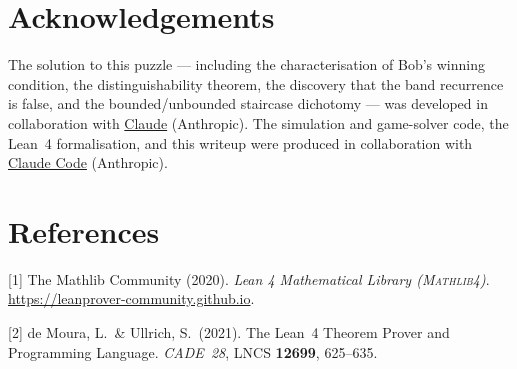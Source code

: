 \documentclass{article}
\begin{document}
\section*{Acknowledgements}

The solution to this puzzle --- including the characterisation of Bob's
winning condition, the distinguishability theorem, the discovery that the
band recurrence is false, and the bounded/unbounded staircase dichotomy
--- was developed in collaboration with
\href{https://claude.ai}{Claude} (Anthropic).  The simulation and
game-solver code, the Lean~4 formalisation, and this writeup were
produced in collaboration with
\href{https://claude.ai/code}{Claude Code} (Anthropic).

\section*{References}

{\small

[1] The Mathlib Community (2020).
\textit{Lean 4 Mathematical Library (\textsc{Mathlib4})}.
\url{https://leanprover-community.github.io}.

[2] de Moura, L.\ \& Ullrich, S.\ (2021).
The Lean~4 Theorem Prover and Programming Language.
\textit{CADE~28}, LNCS \textbf{12699}, 625--635.

}

\end{document}
